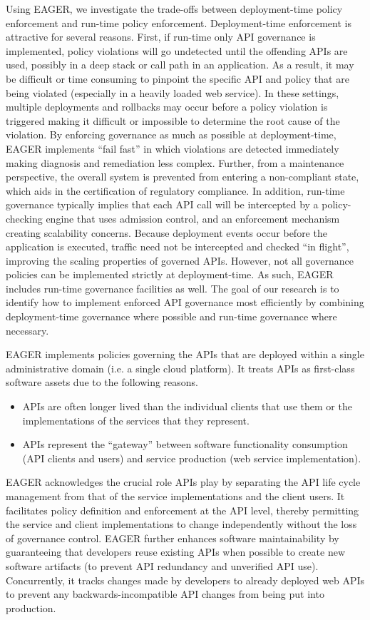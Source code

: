 Using EAGER, we investigate the trade-offs between deployment-time policy
enforcement and run-time policy enforcement.
Deployment-time enforcement is attractive for several
reasons.  First, if run-time only API governance is implemented, 
policy violations will go undetected until the offending APIs are used,
possibly in a deep stack or call path in an application.  
As a result, it may be difficult or time consuming to pinpoint the specific
API and policy that are being violated (especially in a heavily loaded web service).
In these settings, multiple deployments and rollbacks may occur before a policy
violation is triggered making it difficult or impossible to determine the root
cause of the violation.  By enforcing governance as much as possible
at deployment-time,
EAGER implements ``fail fast'' in which violations are detected
immediately making diagnosis and remediation less complex.  
Further, from a maintenance perspective,  the overall
system is prevented from entering a non-compliant state, which aids in the
certification of regulatory compliance.  In addition, run-time governance
typically implies that each API call will be intercepted by a policy-checking engine
that uses admission control, and an enforcement mechanism creating scalability
concerns.  Because deployment
events occur before the application is executed,
traffic need not be intercepted and checked ``in flight'', improving the
scaling properties of governed APIs.  However, not all governance policies can be
implemented strictly at deployment-time.  As such, EAGER includes run-time
governance facilities as well.  The goal of our research is to identify how to
implement enforced API governance most efficiently by combining deployment-time  
governance where possible and run-time governance where necessary.

EAGER implements policies governing the APIs that are 
deployed within a single administrative domain (i.e. a single cloud platform). 
It treats APIs as first-class software assets due to the following reasons.
\begin{itemize}
\item APIs are often
longer lived than the individual clients that use them or the implementations
of the services that they represent.
\item APIs represent the
``gateway'' between software functionality consumption 
(API clients and users) and service
production (web service implementation).
\end{itemize}

EAGER acknowledges the crucial role APIs play
 by separating the API life cycle management from that
of the service implementations and the client users.  
It facilitates policy definition and enforcement at
the API level, thereby permitting the service and client implementations to change
independently without the loss of governance control.
EAGER further enhances software maintainability by guaranteeing that 
developers reuse existing APIs when possible to create new software artifacts
(to prevent API redundancy and unverified API use). Concurrently, it
tracks changes made by developers to already deployed web APIs to prevent
any backwards-incompatible API changes from being put into production.

